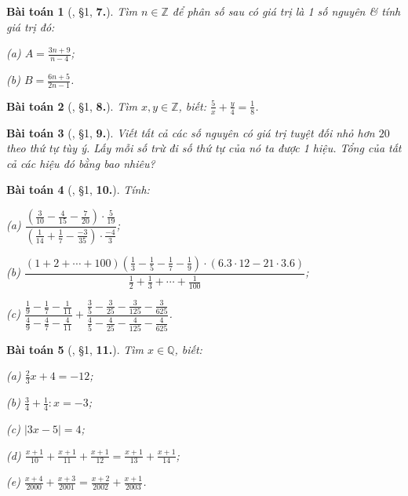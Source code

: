 \documentclass{article}
\numberwithin{equation}{section}
\newtheorem{baitoan}{Bài toán}[section]
\begin{document}
\begin{baitoan}[\cite{Binh_Toan_7_tap_1}, \S1, \textbf{7.}]
	Tìm $n\in\mathbb{Z}$ để phân số sau có giá trị là 1 số nguyên \& tính giá trị đó:
	\begin{enumerate*}
		\item[(a)] $A = \frac{3n + 9}{n - 4}$;
		\item[(b)] $B = \frac{6n + 5}{2n - 1}$.
	\end{enumerate*}
\end{baitoan}

\begin{baitoan}[\cite{Binh_Toan_7_tap_1}, \S1, \textbf{8.}]
	Tìm $x,y\in\mathbb{Z}$, biết: $\frac{5}{x} + \frac{y}{4} = \frac{1}{8}$.
\end{baitoan}

\begin{baitoan}[\cite{Binh_Toan_7_tap_1}, \S1, \textbf{9.}]
	Viết tất cả các số nguyên có giá trị tuyệt đối nhỏ hơn $20$ theo thứ tự tùy ý. Lấy mỗi số trừ đi số thứ tự của nó ta được 1 hiệu. Tổng của tất cả các hiệu đó bằng bao nhiêu?
\end{baitoan}

\begin{baitoan}[\cite{Binh_Toan_7_tap_1}, \S1, \textbf{10.}]
	Tính:
	\begin{enumerate*}
		\item[(a)] $\dfrac{\left(\frac{3}{10} - \frac{4}{15} - \frac{7}{20}\right)\cdot\frac{5}{19}}{\left(\frac{1}{14} + \frac{1}{7} - \frac{-3}{35}\right)\cdot\frac{-4}{3}}$;
		\item[(b)] $\dfrac{(1 + 2 + \cdots + 100)\left(\frac{1}{3} - \frac{1}{5} - \frac{1}{7} - \frac{1}{9}\right)\cdot(6.3\cdot 12 - 21\cdot 3.6)}{\frac{1}{2} + \frac{1}{3} + \cdots + \frac{1}{100}}$;
		\item[(c)] $\dfrac{\frac{1}{9} - \frac{1}{7} - \frac{1}{11}}{\frac{4}{9} - \frac{4}{7} - \frac{4}{11}} + \dfrac{\frac{3}{5} - \frac{3}{25} - \frac{3}{125} - \frac{3}{625}}{\frac{4}{5} - \frac{4}{25} - \frac{4}{125} - \frac{4}{625}}$.
	\end{enumerate*}
\end{baitoan}

\begin{baitoan}[\cite{Binh_Toan_7_tap_1}, \S1, \textbf{11.}]
	Tìm $x\in\mathbb{Q}$, biết:
	\begin{enumerate*}
		\item[(a)] $\frac{2}{3}x + 4 = -12$;
		\item[(b)] $\frac{3}{4} + \frac{1}{4}:x = -3$;
		\item[(c)] $|3x - 5| = 4$;
		\item[(d)] $\frac{x + 1}{10} + \frac{x + 1}{11} + \frac{x + 1}{12} = \frac{x + 1}{13} + \frac{x + 1}{14}$;
		\item[(e)] $\frac{x + 4}{2000} + \frac{x + 3}{2001} = \frac{x + 2}{2002} + \frac{x + 1}{2003}$.
	\end{enumerate*}
\end{baitoan}
\end{document}
